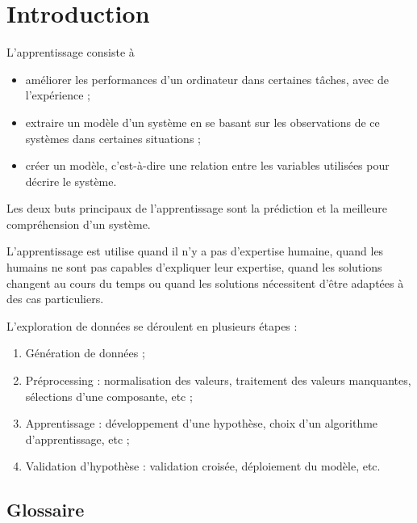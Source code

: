 \chapter{Introduction}

L'apprentissage consiste à

\begin{itemize}
	\item améliorer les performances d'un ordinateur dans certaines tâches, avec de l'expérience ;
	\item extraire un modèle d'un système en se basant sur les observations de ce systèmes dans certaines situations ;
	\item créer un modèle, c'est-à-dire une relation entre les variables utilisées pour décrire le système.
\end{itemize}

Les deux buts principaux de l'apprentissage sont la prédiction et la meilleure compréhension d'un système.

L'apprentissage est utilise quand il n'y a pas d'expertise humaine, quand les humains ne sont pas capables d'expliquer leur expertise, quand les solutions changent au cours du temps ou quand les solutions nécessitent d'être adaptées à des cas particuliers.


L'exploration de données se déroulent en plusieurs étapes :

\begin{enumerate}
	\item Génération de données ;
	\item Préprocessing : normalisation des valeurs, traitement des valeurs manquantes, sélections d'une composante, etc ;
	\item Apprentissage : développement d'une hypothèse, choix d'un algorithme d'apprentissage, etc ;
	\item Validation d'hypothèse : validation croisée, déploiement du modèle, etc.
\end{enumerate}

	\section{Glossaire}
	

